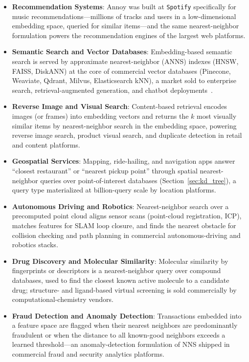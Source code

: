\begin{itemize}
\item \textbf{Recommendation Systems}: Annoy was built at \texttt{Spotify}
  specifically for music recommendations---millions of tracks and users in a
  low-dimensional embedding space, queried for similar items---and the same
  nearest-neighbor formulation powers the recommendation engines of the
  largest web platforms.

\item \textbf{Semantic Search and Vector Databases}: Embedding-based
  semantic search is served by approximate nearest-neighbor (ANNS) indexes
  (HNSW, FAISS, DiskANN) at the core of commercial vector databases
  (Pinecone, Weaviate, Qdrant, Milvus, Elasticsearch kNN), a market sold to
  enterprise search, retrieval-augmented generation, and
  chatbot deployments~\cite{malkov2018}.

\item \textbf{Reverse Image and Visual Search}: Content-based retrieval
  encodes images (or frames) into embedding vectors and returns the $k$ most
  visually similar items by nearest-neighbor search in the embedding space,
  powering reverse image search, product visual search, and duplicate
  detection in retail and content platforms.

\item \textbf{Geospatial Services}: Mapping, ride-hailing, and navigation
  apps answer ``closest restaurant'' or ``nearest pickup point'' through
  spatial nearest-neighbor queries over point-of-interest databases
  (Section~\ref{sec:kd_tree}), a query type materialized at billion-query
  scale by location platforms.

\item \textbf{Autonomous Driving and Robotics}: Nearest-neighbor search over
  a precomputed point cloud aligns sensor scans (point-cloud registration,
  ICP), matches features for SLAM loop closure, and finds the nearest
  obstacle for collision checking and path planning in commercial
  autonomous-driving and robotics stacks.

\item \textbf{Drug Discovery and Molecular Similarity}: Molecular similarity
  by fingerprints or descriptors is a nearest-neighbor query over compound
  databases, used to find the closest known active molecule to a candidate
  drug; structure- and ligand-based virtual screening is sold commercially
  by computational-chemistry vendors.

\item \textbf{Fraud Detection and Anomaly Detection}: Transactions embedded
  into a feature space are flagged when their nearest neighbors are
  predominantly fraudulent or when the distance to all known-good neighbors
  exceeds a learned threshold---an anomaly-detection formulation of NNS
  shipped in commercial fraud and security analytics platforms.


\end{itemize}
